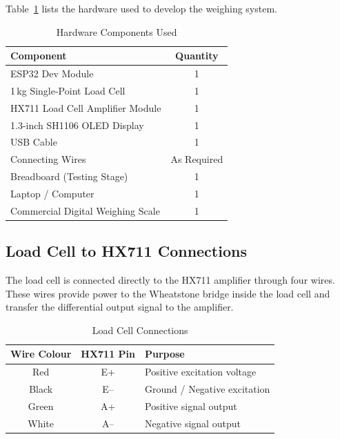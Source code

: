Table~\ref{tab:hardware_components} lists the hardware used to develop the weighing system.

\begin{table}[H]
\centering
\caption{Hardware Components Used}
\label{tab:hardware_components}

\begin{tabular}{|p{8cm}|c|}
\hline
\textbf{Component} & \textbf{Quantity} \\
\hline
ESP32 Dev Module & 1 \\
1\,kg Single-Point Load Cell & 1 \\
HX711 Load Cell Amplifier Module & 1 \\
1.3-inch SH1106 OLED Display & 1 \\
USB Cable & 1 \\
Connecting Wires & As Required \\
Breadboard (Testing Stage) & 1 \\
Laptop / Computer & 1 \\
Commercial Digital Weighing Scale & 1 \\
\hline
\end{tabular}

\end{table}


\subsection{Load Cell to HX711 Connections}

The load cell is connected directly to the HX711 amplifier through four wires. These wires provide power to the Wheatstone bridge inside the load cell and transfer the differential output signal to the amplifier.

\begin{table}[H]
\centering
\caption{Load Cell Connections}
\label{tab:loadcell_connection}

\begin{tabular}{|c|c|p{7cm}|}
\hline
\textbf{Wire Colour} & \textbf{HX711 Pin} & \textbf{Purpose} \\
\hline
Red & E+ & Positive excitation voltage \\
Black & E-- & Ground / Negative excitation \\
Green & A+ & Positive signal output \\
White & A-- & Negative signal output \\
\hline
\end{tabular}

\end{table}

